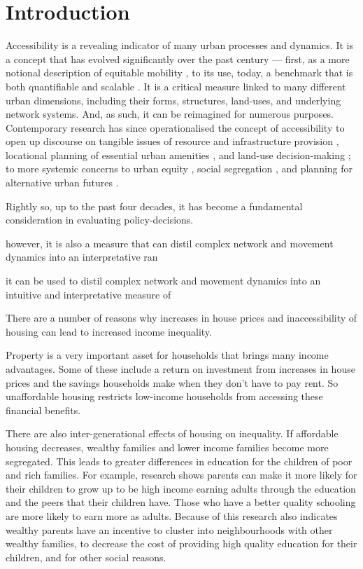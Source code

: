 \linenumbers
\section{Introduction}

Accessibility is a revealing indicator of many urban processes and dynamics. It is a concept that has evolved significantly over the past century --- first, as a more notional description of equitable mobility \citep{muraco1972intraurban,vickerman1974accessibility}, to its use, today, a benchmark that is both quantifiable and scalable \citep{paez2012measuring,masucci2013gravity,piovani2018measuring, yang2019comprehensive}. It is a critical measure linked to many different urban dimensions, including their forms, structures, land-uses, and underlying network systems. And, as such, it can be reimagined for numerous purposes. Contemporary research has since operationalised the concept of accessibility to open up discourse on tangible issues of resource and infrastructure provision \citep{van1999accessibility}, locational planning of essential urban amenities \citep{sa2006does, cheng2013measuring, brondeel2014use}, and land-use decision-making \citep{tsou2005accessibility}; to more systemic concerns to urban equity \citep{van1999accessibility, curl2011does}, social segregation \citep{massey1988dimensions,arapoglou2009new,li2013residential}, and planning for alternative urban futures \citep{cervero1997paradigm, geurs2012accessibility}.



Rightly so, up to the past four decades, it has become a fundamental consideration in evaluating policy-decisions. 

however, it is also a measure that can distil complex network and movement dynamics into an interpretative ran

it can be used to distil complex network and movement dynamics into an intuitive and interpretative measure of 

There are a number of reasons why increases in house prices and inaccessibility of housing can lead to increased income inequality.

Property is a very important asset for households that brings many income advantages. Some of these include a return on investment from increases in house prices and the savings households make when they don’t have to pay rent. So unaffordable housing restricts low-income households from accessing these financial benefits.

There are also inter-generational effects of housing on inequality. If affordable housing decreases, wealthy families and lower income families become more segregated. This leads to greater differences in education for the children of poor and rich families. For example, research shows parents can make it more likely for their children to grow up to be high income earning adults through the education and the peers that their children have. Those who have a better quality schooling are more likely to earn more as adults. Because of this research also indicates wealthy parents have an incentive to cluster into neighbourhoods with other wealthy families, to decrease the cost of providing high quality education for their children, and for other social reasons.

